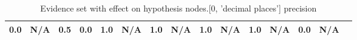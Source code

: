 \begin{table}
\begin{tabular}{c|cc|cc|cc|cc|cc|cc|cc}
\cellcolor{Bittersweet}0.0&\cellcolor{Bittersweet}N/A&\cellcolor{Bittersweet}0.5&\cellcolor{Bittersweet}0.0&\cellcolor{Bittersweet}1.0&\cellcolor{Bittersweet}N/A&\cellcolor{Bittersweet}1.0&\cellcolor{Bittersweet}N/A&\cellcolor{Bittersweet}1.0&\cellcolor{Bittersweet}N/A&\cellcolor{Bittersweet}1.0&\cellcolor{Bittersweet}N/A&\cellcolor{Bittersweet}0.0&\cellcolor{Bittersweet}N/A\\\bottomrule\end{tabular}\caption{Evidence set with effect on hypothesis nodes.[0, 'decimal places'] precision}\end{table}